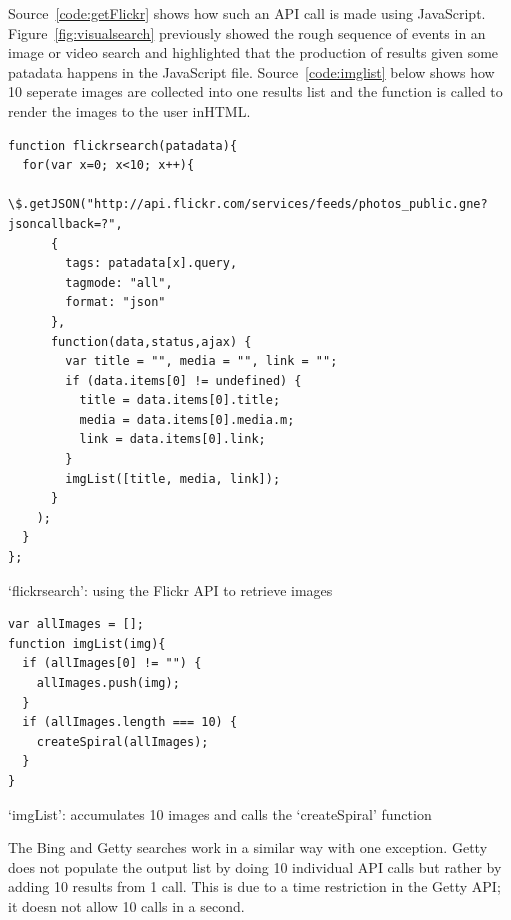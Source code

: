 Source~\ref{code:getFlickr} shows how such an \ac{API} call is made using JavaScript. Figure~\ref{fig:visualsearch} previously showed the rough sequence of events in an image or video search and highlighted that the production of results given some patadata happens in the  JavaScript file. Source~\ref{code:imglist} below shows how 10 seperate images are collected into one results list and the  function is called to render the images to the user in\ac{HTML}.

\begin{listing}[!htbp] %
  \begin{verbatim}
function flickrsearch(patadata){
  for(var x=0; x<10; x++){
    \$.getJSON("http://api.flickr.com/services/feeds/photos_public.gne?jsoncallback=?",
      {
        tags: patadata[x].query,
        tagmode: "all",
        format: "json"
      },
      function(data,status,ajax) {
        var title = "", media = "", link = "";
        if (data.items[0] != undefined) {
          title = data.items[0].title;
          media = data.items[0].media.m;
          link = data.items[0].link;
        }
        imgList([title, media, link]);
      }
    );
  }
};
  \end{verbatim}
\caption[`flickrsearch' function]{`flickrsearch': using the Flickr API to retrieve images}
\label{code:getFlickr}
\end{listing}

\begin{listing}[!htbp] %
  \begin{verbatim}
var allImages = [];
function imgList(img){
  if (allImages[0] != "") {
    allImages.push(img);
  }
  if (allImages.length === 10) {
    createSpiral(allImages);
  }
}
  \end{verbatim}
\caption[`imgList' function]{`imgList': accumulates 10 images and calls the `createSpiral' function}
\label{code:imglist}
\end{listing}

The Bing and Getty searches work in a similar way with one exception. Getty does not populate the output list by doing 10 individual \ac{API} calls but rather by adding 10 results from 1 call. This is due to a time restriction in the Getty \ac{API}; it doesn not allow 10 calls in a second.

\spirals


